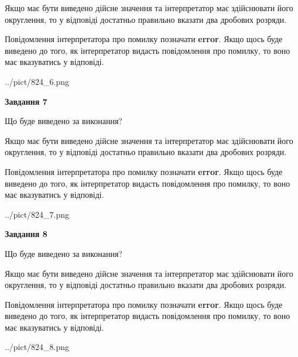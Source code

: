 \documentclass[12pt, ukrainian]{article}
\begin{document}
{\begin {Large}
Якщо має бути виведено дійсне значення та інтерпретатор має здійснювати його округлення, 
то у відповіді достатньо правильно вказати два дробових розряди.

Повідомлення інтерпретатора про помилку позначати \textbf{error}.
Якщо щось буде виведено до того, як інтерпретатор видасть повідомлення про помилку, 
то воно має вказуватись у відповіді. \par

\begin{center}
	{../pict/824_6.png}
\end{center}
\newpage

{\begin {center}\textbf{Завдання 7}\end {center}}\par
Що буде виведено за виконання? \par

Якщо має бути виведено дійсне значення та інтерпретатор має здійснювати його округлення, 
то у відповіді достатньо правильно вказати два дробових розряди.

Повідомлення інтерпретатора про помилку позначати \textbf{error}.
Якщо щось буде виведено до того, як інтерпретатор видасть повідомлення про помилку, 
то воно має вказуватись у відповіді. \par

\begin{center}
	{../pict/824_7.png}
\end{center}
\newpage

{\begin {center}\textbf{Завдання 8}\end {center}}\par
Що буде виведено за виконання? \par

Якщо має бути виведено дійсне значення та інтерпретатор має здійснювати його округлення, 
то у відповіді достатньо правильно вказати два дробових розряди.

Повідомлення інтерпретатора про помилку позначати \textbf{error}.
Якщо щось буде виведено до того, як інтерпретатор видасть повідомлення про помилку, 
то воно має вказуватись у відповіді. \par

\begin{center}
	{../pict/824_8.png}
\end{center}
\newpage


\end{Large}}
\end{document}
